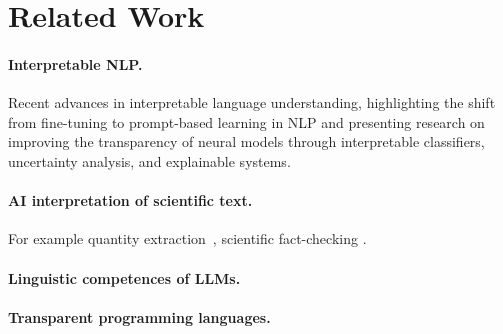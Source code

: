 \section{Related Work}
\label{sec:related}

\paragraph{Interpretable NLP.}

Recent advances in interpretable language understanding, highlighting the shift from fine-tuning to
prompt-based learning in NLP and presenting research on improving the transparency of neural models through
interpretable classifiers, uncertainty analysis, and explainable systems. \cite{Yulan_2023}

\paragraph{AI interpretation of scientific text.}

For example quantity extraction~\cite{bolucu-etal-2023-investigating}, scientific fact-checking
\cite{abu-ahmad-etal-2025-climatecheck-shared}.

\paragraph{Linguistic competences of LLMs.}

\paragraph{Transparent programming languages.}

\cite{perera22,bond25,psallidas18smoke}
